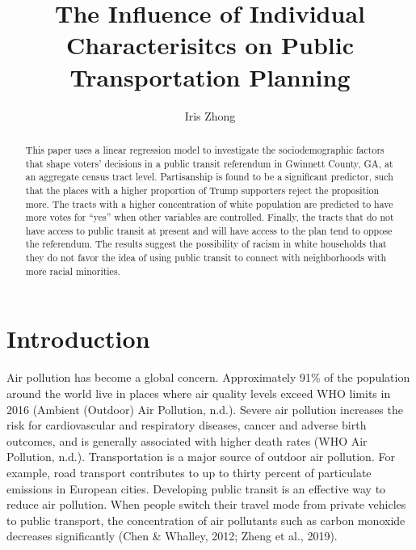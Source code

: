 \documentclass[
]{article}
\title{The Influence of Individual Characterisitcs on Public
Transportation Planning}
\author{Iris Zhong}
\date{}
\begin{document}
\maketitle
\begin{abstract}
This paper uses a linear regression model to investigate the
sociodemographic factors that shape voters' decisions in a public
transit referendum in Gwinnett County, GA, at an aggregate census tract
level. Partisanship is found to be a significant predictor, such that
the places with a higher proportion of Trump supporters reject the
proposition more. The tracts with a higher concentration of white
population are predicted to have more votes for ``yes'' when other
variables are controlled. Finally, the tracts that do not have access to
public transit at present and will have access to the plan tend to
oppose the referendum. The results suggest the possibility of racism in
white households that they do not favor the idea of using public transit
to connect with neighborhoods with more racial minorities.
\end{abstract}

\hypertarget{introduction}{%
\section{Introduction}\label{introduction}}

Air pollution has become a global concern. Approximately 91\% of the
population around the world live in places where air quality levels
exceed WHO limits in 2016 (Ambient (Outdoor) Air Pollution, n.d.).
Severe air pollution increases the risk for cardiovascular and
respiratory diseases, cancer and adverse birth outcomes, and is
generally associated with higher death rates (WHO \textbar{} Air
Pollution, n.d.). Transportation is a major source of outdoor air
pollution. For example, road transport contributes to up to thirty
percent of particulate emissions in European cities. Developing public
transit is an effective way to reduce air pollution. When people switch
their travel mode from private vehicles to public transport, the
concentration of air pollutants such as carbon monoxide decreases
significantly (Chen \& Whalley, 2012; Zheng et al., 2019).
\end{document}
